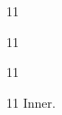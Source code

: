 \documentclass[paper=A4]{ropas-poster}
\begin{document}
\begin{postergrid}{1}{1}
\begin{posterblock*}{1}{1}
\begin{postergrid}{1}{1}
\begin{posterblock}{1}{1}
Inner.
\end{posterblock}
\end{postergrid}
\end{posterblock*}
\end{postergrid}
\end{document}
